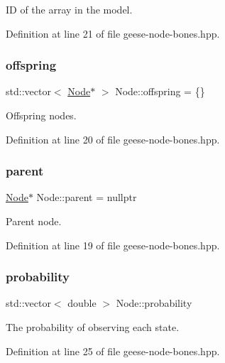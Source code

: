 ID of the array in the model. 



Definition at line 21 of file geese-\/node-\/bones.\+hpp.

\mbox{\label{class_node_a4e7e9c69da2575cad9c5fb7865dd42c7}} 
\subsubsection{\texorpdfstring{offspring}{offspring}}
{\footnotesize\ttfamily std\+::vector$<$ \hyperlink{class_node}{Node}$\ast$ $>$ Node\+::offspring = \{\}}



Offspring nodes. 



Definition at line 20 of file geese-\/node-\/bones.\+hpp.

\mbox{\label{class_node_ad8184598cdea70e4bbdfd76f2b0f9e85}} 
\subsubsection{\texorpdfstring{parent}{parent}}
{\footnotesize\ttfamily \hyperlink{class_node}{Node}$\ast$ Node\+::parent = nullptr}



Parent node. 



Definition at line 19 of file geese-\/node-\/bones.\+hpp.

\mbox{\label{class_node_a867d5e07f62da01392a817042c77735f}} 
\subsubsection{\texorpdfstring{probability}{probability}}
{\footnotesize\ttfamily std\+::vector$<$ double $>$ Node\+::probability}



The probability of observing each state. 



Definition at line 25 of file geese-\/node-\/bones.\+hpp.

\mbox{\label{class_node_afb0c9a29d8b65c33e9cec846e7d5811d}} 
